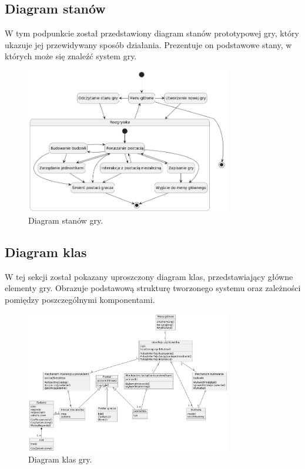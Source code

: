 \subsection{Diagram stanów}\label{ss:state}
W tym podpunkcie został przedstawiony diagram stanów prototypowej gry, który ukazuje jej przewidywany sposób działania.
Prezentuje on podstawowe stany, w których może się znaleźć system gry.
\begin{figure}[!htbp]
    \centering
    \includegraphics[width=0.8\textwidth]{images/diagrams/state.png}
    \caption{Diagram stanów gry.}\label{fig:states}
\end{figure}

\subsection{Diagram klas}\label{ss:class}
W tej sekcji został pokazany uproszczony diagram klas, przedstawiający główne elementy gry. Obrazuje podstawową
strukturę tworzonego systemu oraz zależności pomiędzy poszczególnymi komponentami.
\begin{figure}[!htbp]
    \centering
    \includegraphics[width=0.8\textwidth]{images/diagrams/class.png}
    \caption{Diagram klas gry.}\label{fig:classes}
\end{figure}